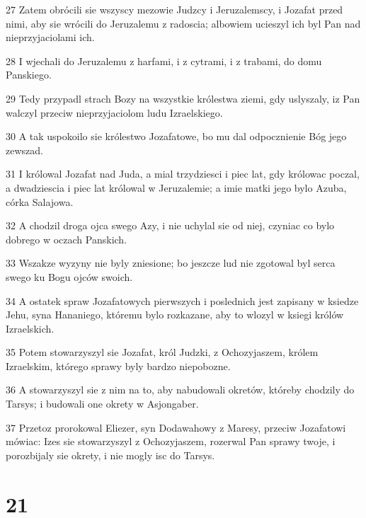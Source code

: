 \par 27 Zatem obrócili sie wszyscy mezowie Judzcy i Jeruzalemscy, i Jozafat przed nimi, aby sie wrócili do Jeruzalemu z radoscia; albowiem ucieszyl ich byl Pan nad nieprzyjaciolami ich.
\par 28 I wjechali do Jeruzalemu z harfami, i z cytrami, i z trabami, do domu Panskiego.
\par 29 Tedy przypadl strach Bozy na wszystkie królestwa ziemi, gdy uslyszaly, iz Pan walczyl przeciw nieprzyjaciolom ludu Izraelskiego.
\par 30 A tak uspokoilo sie królestwo Jozafatowe, bo mu dal odpocznienie Bóg jego zewszad.
\par 31 I królowal Jozafat nad Juda, a mial trzydziesci i piec lat, gdy królowac poczal, a dwadziescia i piec lat królowal w Jeruzalemie; a imie matki jego bylo Azuba, córka Salajowa.
\par 32 A chodzil droga ojca swego Azy, i nie uchylal sie od niej, czyniac co bylo dobrego w oczach Panskich.
\par 33 Wszakze wyzyny nie byly zniesione; bo jeszcze lud nie zgotowal byl serca swego ku Bogu ojców swoich.
\par 34 A ostatek spraw Jozafatowych pierwszych i poslednich jest zapisany w ksiedze Jehu, syna Hananiego, któremu bylo rozkazane, aby to wlozyl w ksiegi królów Izraelskich.
\par 35 Potem stowarzyszyl sie Jozafat, król Judzki, z Ochozyjaszem, królem Izraelskim, którego sprawy byly bardzo niepobozne.
\par 36 A stowarzyszyl sie z nim na to, aby nabudowali okretów, któreby chodzily do Tarsys; i budowali one okrety w Asjongaber.
\par 37 Przetoz prorokowal Eliezer, syn Dodawahowy z Maresy, przeciw Jozafatowi mówiac: Izes sie stowarzyszyl z Ochozyjaszem, rozerwal Pan sprawy twoje, i porozbijaly sie okrety, i nie mogly isc do Tarsys.

\chapter{21}

